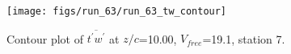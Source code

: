 \begin{figure}[H]
\centering
\texttt{[image: figs/run\_63/run\_63\_tw\_contour]}
\caption{Contour plot of $\overline{t^\prime w^\prime}$ at $z/c$=10.00, $V_{free}$=19.1, station 7.}
\label{fig:run_63_tw_contour}
\end{figure}


